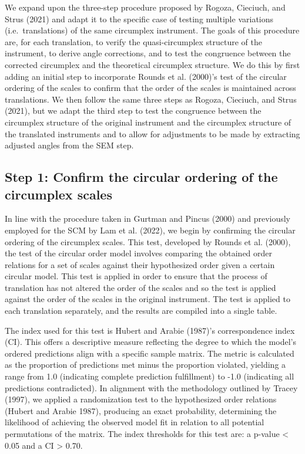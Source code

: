 \documentclass[
  default,
]{sn-jnl}
\begin{document}
We expand upon the three-step procedure proposed by Rogoza, Cieciuch,
and Strus (2021) and adapt it to the specific case of testing multiple
variations (i.e.~translations) of the same circumplex instrument. The
goals of this procedure are, for each translation, to verify the
quasi-circumplex structure of the instrument, to derive angle
corrections, and to test the congruence between the corrected circumplex
and the theoretical circumplex structure. We do this by first adding an
initial step to incorporate Rounds et al. (2000)'s test of the circular
ordering of the scales to confirm that the order of the scales is
maintained across translations. We then follow the same three steps as
Rogoza, Cieciuch, and Strus (2021), but we adapt the third step to test
the congruence between the circumplex structure of the original
instrument and the circumplex structure of the translated instruments
and to allow for adjustments to be made by extracting adjusted angles
from the SEM step.

\subsection{Step 1: Confirm the circular ordering of the circumplex
scales}\label{step-1-confirm-the-circular-ordering-of-the-circumplex-scales}

In line with the procedure taken in Gurtman and Pincus (2000) and
previously employed for the SCM by Lam et al. (2022), we begin by
confirming the circular ordering of the circumplex scales. This test,
developed by Rounds et al. (2000), the test of the circular order model
involves comparing the obtained order relations for a set of scales
against their hypothesized order given a certain circular model. This
test is applied in order to ensure that the process of translation has
not altered the order of the scales and so the test is applied against
the order of the scales in the original instrument. The test is applied
to each translation separately, and the results are compiled into a
single table.

The index used for this test is Hubert and Arabie (1987)'s
correspondence index (CI). This offers a descriptive measure reflecting
the degree to which the model's ordered predictions align with a
specific sample matrix. The metric is calculated as the proportion of
predictions met minus the proportion violated, yielding a range from 1.0
(indicating complete prediction fulfillment) to -1.0 (indicating all
predictions contradicted). In alignment with the methodology outlined by
Tracey (1997), we applied a randomization test to the hypothesized order
relations (Hubert and Arabie 1987), producing an exact probability,
determining the likelihood of achieving the observed model fit in
relation to all potential permutations of the matrix. The index
thresholds for this test are: a p-value \textless{} 0.05 and a CI
\textgreater{} 0.70.
\end{document}
